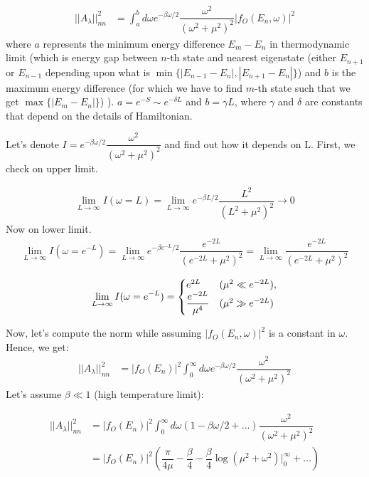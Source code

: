 \documentclass[11pt,a4paper]{article}
\begin{document}
\begin{align*}
||A_{\lambda}||^2_{nn} &=\int_a^{b} d \omega e^{-\beta \omega/2} \dfrac{\omega^2}{(\omega^2 + \mu^2)^2}  |f_O(E_n, \omega)|^2 
\end{align*}
where $a$ represents the minimum energy difference $E_m-E_n$ in thermodynamic limit (which is energy gap between $n$-th state and nearest eigenstate (either $E_{n+1}$ or $E_{n-1}$ depending upon what is $\min \{|E_{n-1}-E_{n}|,|E_{n+1}-E_{n}| \}$) and $b$ is the maximum energy difference (for which we have to find $m$-th state such that we get $\max \{|E_{m}-E_{n}|\}$) ). $a= e^{-S} \sim e^{-\delta L}$ and $b= \gamma L$, where $\gamma$ and $\delta$ are constants that depend on the details of Hamiltonian.

Let's denote $I=e^{-\beta \omega/2} \dfrac{\omega^2}{(\omega^2 + \mu^2)^2}$ and find out how it depends on L. First, we check on upper limit.

\begin{align*}
\lim_{L \rightarrow \infty}I(\omega=L)=\lim_{L \rightarrow \infty} e^{-\beta L/2} \dfrac{L^2}{(L^2 + \mu^2)^2} \rightarrow 0
\end{align*}
Now on lower limit.
\begin{align*}
\lim_{L \rightarrow \infty}I(\omega=e^{-L})=\lim_{L \rightarrow \infty} e^{-\beta e^{-L}/2} \dfrac{e^{-2L}}{(e^{-2L} + \mu^2)^2}=\lim_{L \rightarrow \infty} \dfrac{e^{-2L}}{(e^{-2L} + \mu^2)^2}
\end{align*}

\begin{equation}
  \lim_{L \rightarrow \infty}I(\omega=e^{-L})=\left\{
  \begin{array}{@{}ll@{}}
    e^{2L} & (\mu^2 \ll e^{-2L}), \\
     \dfrac{e^{-2L}}{ \mu^4} & (\mu^2 \gg e^{-2L})
  \end{array}\right.
\end{equation}

Now, let's compute the norm while assuming $ |f_O(E_n, \omega)|^2 $ is a constant in $\omega$. Hence, we get:
\begin{align*}
||A_{\lambda}||^2_{nn} &=  |f_O(E_n)|^2 \int_0^{\infty} d \omega e^{-\beta \omega/2} \dfrac{\omega^2}{(\omega^2 + \mu^2)^2} 
\end{align*}
Let's assume $\beta \ll 1$ (high temperature limit):

\begin{align*}
||A_{\lambda}||^2_{nn} &=  |f_O(E_n)|^2 \int_0^{\infty} d \omega \left(1-\beta \omega/2 + \ldots \right) \dfrac{\omega^2}{(\omega^2 + \mu^2)^2}  \\
&=|f_O(E_n)|^2\left(\dfrac{\pi}{4 \mu}-\dfrac{\beta }{4}-\dfrac{\beta }{4} \log (\mu^2+ \omega^2)|_0^{\infty}  + \ldots \right) \\
\end{align*}
\end{document}
